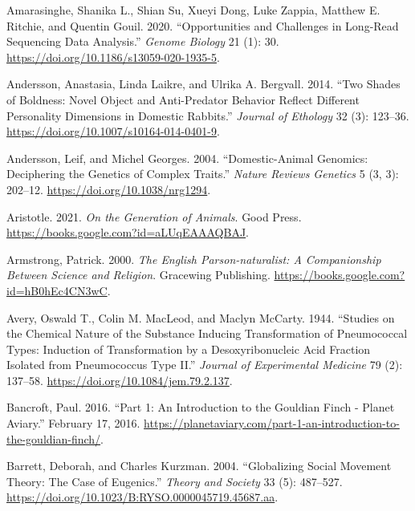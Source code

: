 \documentclass[
]{book}
\newlength{\cslhangindent}
\newlength{\cslentryspacingunit} %
\newenvironment{CSLReferences}[2] %
 {%
  \setlength{\parindent}{0pt}
  \ifodd #1
  \let\oldpar\par
  \def\par{\hangindent=\cslhangindent\oldpar}
  \fi
  \setlength{\parskip}{#2\cslentryspacingunit}
 }%
 {}
\begin{document}
\begin{CSLReferences}{1}{0}
\leavevmode{}%
Amarasinghe, Shanika L., Shian Su, Xueyi Dong, Luke Zappia, Matthew E. Ritchie, and Quentin Gouil. 2020. {``Opportunities and Challenges in Long-Read Sequencing Data Analysis.''} \emph{Genome Biology} 21 (1): 30. \url{https://doi.org/10.1186/s13059-020-1935-5}.

\leavevmode{}%
Andersson, Anastasia, Linda Laikre, and Ulrika A. Bergvall. 2014. {``Two Shades of Boldness: Novel Object and Anti-Predator Behavior Reflect Different Personality Dimensions in Domestic Rabbits.''} \emph{Journal of Ethology} 32 (3): 123--36. \url{https://doi.org/10.1007/s10164-014-0401-9}.

\leavevmode{}%
Andersson, Leif, and Michel Georges. 2004. {``Domestic-Animal Genomics: Deciphering the Genetics of Complex Traits.''} \emph{Nature Reviews Genetics} 5 (3, 3): 202--12. \url{https://doi.org/10.1038/nrg1294}.

\leavevmode{}%
Aristotle. 2021. \emph{On the {Generation} of {Animals}}. {Good Press}. \url{https://books.google.com?id=aLUqEAAAQBAJ}.

\leavevmode{}%
Armstrong, Patrick. 2000. \emph{The {English Parson-naturalist}: {A Companionship Between Science} and {Religion}}. {Gracewing Publishing}. \url{https://books.google.com?id=hB0hEc4CN3wC}.

\leavevmode{}%
Avery, Oswald T., Colin M. MacLeod, and Maclyn McCarty. 1944. {``Studies on the Chemical Nature of the Substance Inducing Transformation of Pneumococcal Types: {Induction} of Transformation by a Desoxyribonucleic Acid Fraction Isolated from Pneumococcus Type {II}.''} \emph{Journal of Experimental Medicine} 79 (2): 137--58. \url{https://doi.org/10.1084/jem.79.2.137}.

\leavevmode{}%
Bancroft, Paul. 2016. {``Part 1: {An} Introduction to the {Gouldian} Finch - {Planet Aviary}.''} February 17, 2016. \url{https://planetaviary.com/part-1-an-introduction-to-the-gouldian-finch/}.

\leavevmode{}%
Barrett, Deborah, and Charles Kurzman. 2004. {``Globalizing Social Movement Theory: {The} Case of Eugenics.''} \emph{Theory and Society} 33 (5): 487--527. \url{https://doi.org/10.1023/B:RYSO.0000045719.45687.aa}.


\end{CSLReferences}
\end{document}
